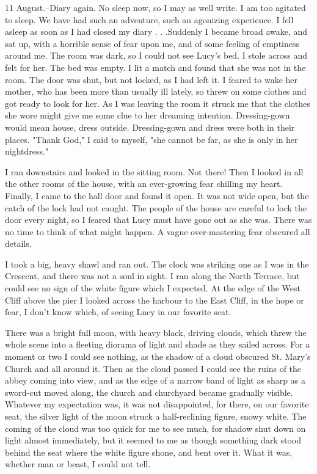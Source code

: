 11 August.--Diary again. No sleep now, so I may as well write. I am too agitated to sleep. We have had such an adventure, such an agonizing experience. I fell asleep as soon as I had closed my diary . . .Suddenly I became broad awake, and sat up, with a horrible sense of fear upon me, and of some feeling of emptiness around me. The room was dark, so I could not see Lucy's bed. I stole across and felt for her. The bed was empty. I lit a match and found that she was not in the room. The door was shut, but not locked, as I had left it. I feared to wake her mother, who has been more than usually ill lately, so threw on some clothes and got ready to look for her. As I was leaving the room it struck me that the clothes she wore might give me some clue to her dreaming intention. Dressing-gown would mean house, dress outside. Dressing-gown and dress were both in their places. "Thank God," I said to myself, "she cannot be far, as she is only in her nightdress." 

I ran downstairs and looked in the sitting room. Not there! Then I looked in all the other rooms of the house, with an ever-growing fear chilling my heart. Finally, I came to the hall door and found it open. It was not wide open, but the catch of the lock had not caught. The people of the house are careful to lock the door every night, so I feared that Lucy must have gone out as she was. There was no time to think of what might happen. A vague over-mastering fear obscured all details. 

I took a big, heavy shawl and ran out. The clock was striking one as I was in the Crescent, and there was not a soul in sight. I ran along the North Terrace, but could see no sign of the white figure which I expected. At the edge of the West Cliff above the pier I looked across the harbour to the East Cliff, in the hope or fear, I don't know which, of seeing Lucy in our favorite seat. 

There was a bright full moon, with heavy black, driving clouds, which threw the whole scene into a fleeting diorama of light and shade as they sailed across. For a moment or two I could see nothing, as the shadow of a cloud obscured St. Mary's Church and all around it. Then as the cloud passed I could see the ruins of the abbey coming into view, and as the edge of a narrow band of light as sharp as a sword-cut moved along, the church and churchyard became gradually visible. Whatever my expectation was, it was not disappointed, for there, on our favorite seat, the silver light of the moon struck a half-reclining figure, snowy white. The coming of the cloud was too quick for me to see much, for shadow shut down on light almost immediately, but it seemed to me as though something dark stood behind the seat where the white figure shone, and bent over it. What it was, whether man or beast, I could not tell. 

